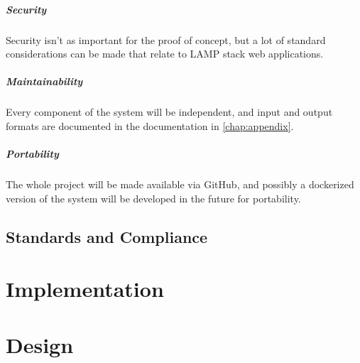 \documentclass[11pt,twoside]{report}
\begin{document}
\paragraph{Security}
Security isn't as important for the proof of concept, but a lot of standard considerations can be made that relate to LAMP stack web applications.

\paragraph{Maintainability}
Every component of the system will be independent, and input and output formats are documented in the documentation in \ref{chap:appendix}.

\paragraph{Portability}
The whole project will be made available via GitHub, and possibly a dockerized version of the system will be developed in the future for portability.

\section{Standards and Compliance}
\label{sec:standards}

\chapter{Implementation}
\label{chap:implemention}

\chapter{Design}
\label{chap:design}
\end{document}
